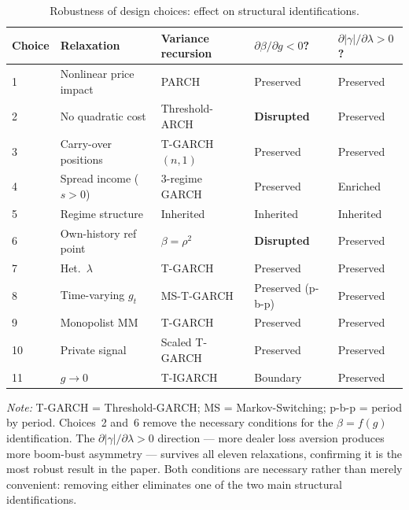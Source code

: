 \documentclass[12pt,a4paper]{article}
\theoremstyle{definition}
\begin{document}
\begin{table}[ht]
\centering
\caption{Robustness of design choices: effect on structural identifications.}
\label{tab:robustness_expanded}
\small
\begin{tabular}{p{0.8cm} p{2.8cm} p{2.4cm} p{2.4cm} p{2.3cm}}
\toprule
Choice & Relaxation & Variance recursion
& $\partial\beta/\partial g < 0$?
& $\partial|\gamma|/\partial\lambda > 0$? \\
\midrule
1 & Nonlinear price impact   & PARCH          & Preserved & Preserved \\
2 & No quadratic cost        & Threshold-ARCH & \textbf{Disrupted} & Preserved \\
3 & Carry-over positions     & T-GARCH$(n,1)$ & Preserved & Preserved \\
4 & Spread income ($s>0$)    & 3-regime GARCH & Preserved & Enriched \\
5 & Regime structure         & Inherited      & Inherited & Inherited \\
6 & Own-history ref point    & $\beta=\rho^2$ & \textbf{Disrupted} & Preserved \\
7 & Het.\ $\lambda$          & T-GARCH        & Preserved & Preserved \\
8 & Time-varying $g_t$       & MS-T-GARCH     & Preserved (p-b-p) & Preserved \\
9 & Monopolist MM            & T-GARCH        & Preserved & Preserved \\
10 & Private signal          & Scaled T-GARCH & Preserved & Preserved \\
11 & $g \to 0$               & T-IGARCH       & Boundary  & Preserved \\
\bottomrule
\end{tabular}
\medskip

\noindent\footnotesize{\textit{Note:} T-GARCH = Threshold-GARCH; MS = Markov-Switching;
p-b-p = period by period. Choices~2 and~6 remove the necessary conditions for
the $\beta = f(g)$ identification. The $\partial|\gamma|/\partial\lambda > 0$
direction --- more dealer loss aversion produces more boom-bust asymmetry ---
survives all eleven relaxations, confirming it is the most robust result in
the paper. Both conditions are necessary rather than merely convenient:
removing either eliminates one of the two main structural identifications.}
\end{table}

\end{document}
